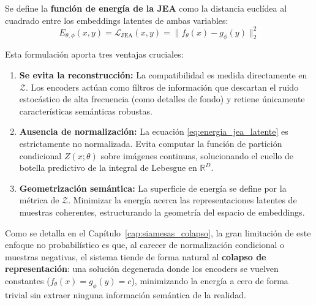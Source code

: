 Se define la \textbf{función de energía de la JEA} como la distancia euclídea al cuadrado entre los embeddings latentes de ambas variables:
\begin{equation}
\label{eq:energia_jea_latente}
E_{\theta, \phi}(x, y) = \mathcal{L}_{\text{JEA}}(x, y) = \| f_\theta(x) - g_\phi(y) \|_2^2
\end{equation}

Esta formulación aporta tres ventajas cruciales:
\begin{enumerate}
    \item \textbf{Se evita la reconstrucción:} La compatibilidad es medida directamente en $\mathcal{Z}$. Los encoders actúan como filtros de información que descartan el ruido estocástico de alta frecuencia (como detalles de fondo) y retiene únicamente características semánticas robustas.
    \item \textbf{Ausencia de normalización:} La ecuación \eqref{eq:energia_jea_latente} es estrictamente no normalizada. Evita computar la función de partición condicional $Z(x; \theta)$ sobre imágenes continuas, solucionando el cuello de botella predictivo de la integral de Lebesgue en $\mathbb{R}^D$.
    \item \textbf{Geometrización semántica:} La superficie de energía se define por la métrica de $\mathcal{Z}$. Minimizar la energía acerca las representaciones latentes de muestras coherentes, estructurando la geometría del espacio de embeddings.
\end{enumerate}

Como se detalla en el Capítulo~\ref{cap:siamesas_colapso}, la gran limitación de este enfoque no probabilístico es que, al carecer de normalización condicional o muestras negativas, el sistema tiende de forma natural al \textbf{colapso de representación}: una solución degenerada donde los encoders se vuelven constantes ($f_\theta(x) = g_\phi(y) = c$), minimizando la energía a cero de forma trivial sin extraer ninguna información semántica de la realidad.